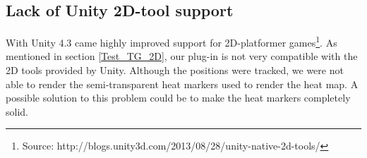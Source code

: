 \subsection{Lack of Unity 2D-tool support}
\label{Issues_2DSupport}
With Unity 4.3 came highly improved support for 2D-platformer games\footnote{Source: http://blogs.unity3d.com/2013/08/28/unity-native-2d-tools/}. As mentioned in section \ref{Test_TG_2D}, our plug-in is not very compatible with the 2D tools provided by Unity. Although the positions were tracked, we were not able to render the semi-transparent heat markers used to render the heat map. A possible solution to this problem could be to make the heat markers completely solid.

